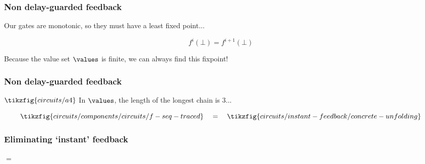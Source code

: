 \begin{frame}
    \frametitle{Non delay-guarded feedback}

    \wait

    Our gates are \alert{monotonic}, so they must have a \alert{least fixed point}...
    
    \[f^i(\bot) = f^{i+1}(\bot)\]

    \wait

    Because the value set \(\values\) is finite, we can always find this fixpoint!    
    
\end{frame}

\begin{frame}
    \frametitle{Non delay-guarded feedback}

    \(
        \tikzfig{circuits/a4}    
    \)
    \quad
    In \(\values\), the length of the longest chain is \alert{3}...

    \wait

    \[
        \tikzfig{circuits/components/circuits/f-seq-traced}
        \quad=\quad
        \tikzfig{circuits/instant-feedback/concrete-unfolding}
    \]
    

\end{frame}

\begin{frame}
    \frametitle{Eliminating `instant' feedback}

    \begin{center}
        \begin{minipage}{0.25\textwidth}
            \quad\(=\)
        \end{minipage}
        \begin{minipage}{0.4\textwidth}
        \end{minipage}
    \end{center}
\end{frame}

